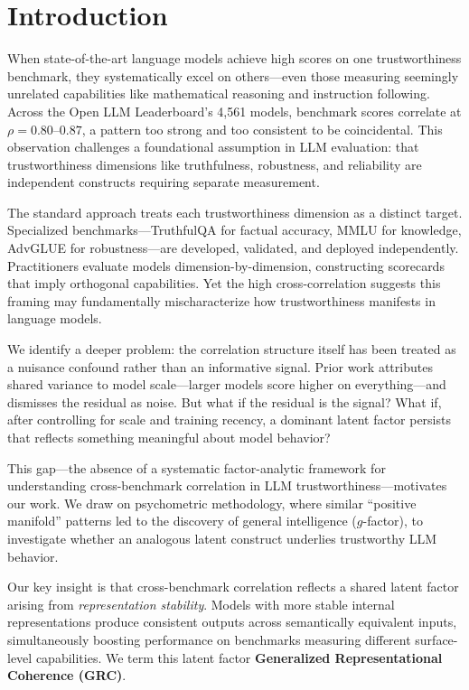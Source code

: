 \section{Introduction}

When state-of-the-art language models achieve high scores on one trustworthiness benchmark, they systematically excel on others---even those measuring seemingly unrelated capabilities like mathematical reasoning and instruction following. Across the Open LLM Leaderboard's 4,561 models, benchmark scores correlate at $\rho = 0.80$--$0.87$, a pattern too strong and too consistent to be coincidental. This observation challenges a foundational assumption in LLM evaluation: that trustworthiness dimensions like truthfulness, robustness, and reliability are independent constructs requiring separate measurement.

The standard approach treats each trustworthiness dimension as a distinct target. Specialized benchmarks---TruthfulQA for factual accuracy, MMLU for knowledge, AdvGLUE for robustness---are developed, validated, and deployed independently. Practitioners evaluate models dimension-by-dimension, constructing scorecards that imply orthogonal capabilities. Yet the high cross-correlation suggests this framing may fundamentally mischaracterize how trustworthiness manifests in language models.

We identify a deeper problem: the correlation structure itself has been treated as a nuisance confound rather than an informative signal. Prior work attributes shared variance to model scale---larger models score higher on everything---and dismisses the residual as noise. But what if the residual is the signal? What if, after controlling for scale and training recency, a dominant latent factor persists that reflects something meaningful about model behavior?

This gap---the absence of a systematic factor-analytic framework for understanding cross-benchmark correlation in LLM trustworthiness---motivates our work. We draw on psychometric methodology, where similar ``positive manifold'' patterns led to the discovery of general intelligence ($g$-factor), to investigate whether an analogous latent construct underlies trustworthy LLM behavior.

Our key insight is that cross-benchmark correlation reflects a shared latent factor arising from \emph{representation stability}. Models with more stable internal representations produce consistent outputs across semantically equivalent inputs, simultaneously boosting performance on benchmarks measuring different surface-level capabilities. We term this latent factor \textbf{Generalized Representational Coherence (GRC)}.

